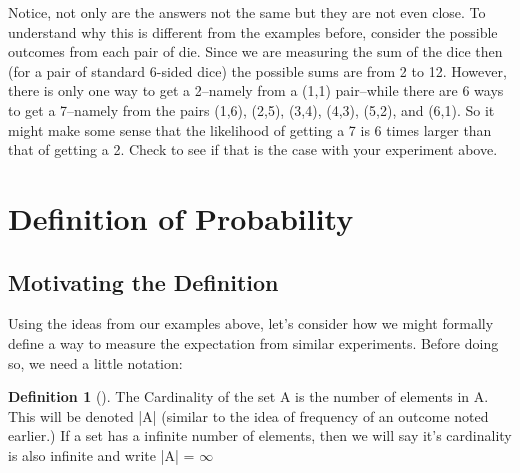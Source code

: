 \documentclass[10pt,]{book}
\theoremstyle{plain}
\theoremstyle{definition}
\newtheorem{definition}[theorem]{Definition}
\theoremstyle{definition}
\numberwithin{equation}{section}
\begin{document}
\par
Notice, not only are the answers not the same but they are not even close. To understand why this 
	is different from the examples before, consider the possible outcomes from each pair of die. Since we
	are measuring the sum of the dice then (for a pair of standard 6-sided dice) the possible sums are from 
	2 to 12. However, there is only one way to get a 2--namely from a (1,1) pair--while there are 6 ways to get
	a 7--namely from the pairs (1,6), (2,5), (3,4), (4,3), (5,2), and (6,1). So it might make some sense
	that the likelihood of getting a 7 is 6 times larger than that of getting a 2. Check to see if that
	is the case with your experiment above.%
\typeout{************************************************}
\typeout{************************************************}
\section[Definition of Probability]{Definition of Probability}\label{section-13}
\typeout{************************************************}
\typeout{************************************************}
\subsection[Motivating the Definition]{Motivating the Definition}\label{ProbabilityDefns}
Using the ideas from our examples above, let's consider how we might formally define a way
	to measure the expectation from similar experiments.  Before doing so, we need a little notation:%
\begin{definition}[]\label{definition-4}
The Cardinality of the set A is the number of elements in A. This will be denoted |A| (similar
	to the idea of frequency of an outcome noted earlier.) If a set has
	a infinite number of elements, then we will say it's cardinality is also infinite and 
	write |A| = \(\infty\)\end{definition}
\par
\end{document}
